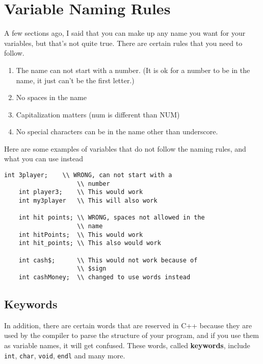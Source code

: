 \section{Variable Naming Rules}
A few sections ago, I said that you can make up any name you
want for your variables, but that's not quite true. There are certain rules that you need to follow.
\begin{enumerate}
    \item The name can not start with a number. (It is ok for a number to be in the name, it just can't be the first letter.)
    \item No spaces in the name
    \item Capitalization matters (num is different than NUM) 
    \item No special characters can be in the name other than underscore.
\end{enumerate}

Here are some examples of variables that do not follow the naming rules, and what you can use instead
\begin{lstlisting}[frame=single]
    int 3player;    \\ WRONG, can not start with a 
                    \\ number
    int player3;    \\ This would work
    int my3player   \\ This will also work
    
    int hit points; \\ WRONG, spaces not allowed in the 
                    \\ name
    int hitPoints;  \\ This would work
    int hit_points; \\ This also would work
    
    int cash$;      \\ This would not work because of 
                    \\ $sign
    int cashMoney;  \\ changed to use words instead
\end{lstlisting}
\subsection{Keywords}
In addition, there
are certain words that are reserved in C++ because they are
used by the compiler to parse the structure of your program,
and if you use them as variable names, it will get confused.
These words, called {\bf keywords}, include {\tt int},
{\tt char}, {\tt void}, {\tt endl} and many more.

